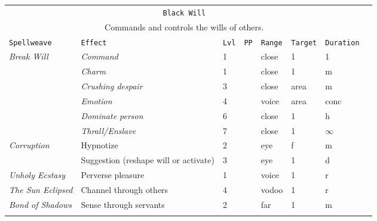 \documentclass[10pt,a4paper]{article}
\begin{document}
\begin{table}[htbp!]
\begin{tabular}{llllllll}
    \multicolumn{7}{c}{\texttt{Black Will}}\\
    \multicolumn{7}{c}{Commands and controls the wills of others.}\\
    \hline
    \texttt{Spellweave} & \texttt{Effect} & \texttt{Lvl} & \texttt{PP} & \texttt{Range} & \texttt{Target} & \texttt{Duration} \\
    \hline
    \multirow{1}{*}{\textit{Break Will}} & \textit{Command} & 1 && close & 1 & 1 \\
    										& \textit{Charm} & 1 && close & 1 & m \\
    										& \textit{Crushing despair} & 3 && close & area & m \\
    									    & \textit{Emotion} & 4 && voice & area & conc \\
    										& \textit{Dominate person}  & 6 && close & 1 & h  \\
    										& \textit{Thrall/Enslave} & 7 && close & 1 & $\infty$ \\
    \hline
    \multirow{1}{*}{\textit{Corruption}} & Hypnotize & 2 && eye & f & m \\
    										& Suggestion (reshape will or activate) & 3 && eye & 1 & d \\
    \hline
    \multirow{1}{*}{\textit{Unholy Ecstasy}} & Perverse pleasure & 1 && voice & 1 & r \\
    \hline
    \multirow{1}{*}{\textit{The Sun Eclipsed}} & Channel through others & 4 && vodoo & 1 & r \\
    \hline
     \multirow{1}{*}{\textit{Bond of Shadows}} & Sense through servants & 2 && far & 1 & m \\
        &&&&&&\\
    

\end{tabular}
\end{table}
\end{document}
